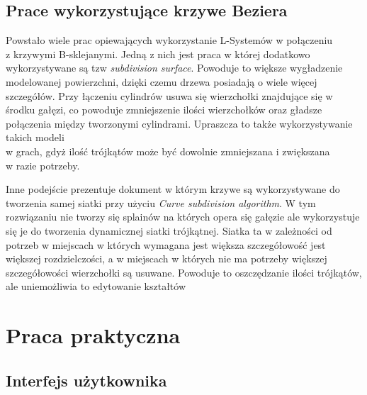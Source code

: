 \documentclass[12pt]{report}
\begin{document}
\begin{sloppypar}
\section{Prace wykorzystujące krzywe Beziera}
Powstało wiele prac opiewających wykorzystanie L-Systemów w połączeniu \\z krzywymi B-sklejanymi. Jedną z nich jest praca\cite{Sub} w której dodatkowo wykorzystywane są tzw \textit{subdivision surface}. Powoduje to większe wygładzenie modelowanej powierzchni, dzięki czemu drzewa posiadają o wiele więcej szczegółów. Przy łączeniu cylindrów usuwa się wierzchołki znajdujące się w środku gałęzi, co powoduje zmniejszenie ilości wierzchołków oraz gładsze połączenia między tworzonymi cylindrami. Upraszcza to także wykorzystywanie takich modeli \\w grach, gdyż ilość trójkątów może być dowolnie zmniejszana i zwiększana \\w razie potrzeby.
\par Inne podejście prezentuje dokument\cite{VertexVertex} w którym krzywe są wykorzystywane do tworzenia samej siatki przy użyciu \textit{Curve subdivision algorithm}. W tym rozwiązaniu nie tworzy się splainów na których opera się gałęzie ale wykorzystuje się je do tworzenia dynamicznej siatki trójkątnej. Siatka ta w zależności od potrzeb w miejscach w których wymagana jest większa szczegółowość jest większej rozdzielczości, a w miejscach w których nie ma potrzeby większej szczegółowości wierzchołki są usuwane. Powoduje to oszczędzanie ilości trójkątów, ale uniemożliwia to edytowanie kształtów 
\chapter{Praca praktyczna}

\section{Interfejs użytkownika}


\end{sloppypar}
\end{document}
